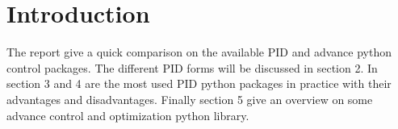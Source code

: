 
\section{Introduction}

The report give a quick comparison on the available  PID and advance python control packages. The different PID forms will be discussed in section 2. In section 3 and 4 are the most used PID python packages in practice with their advantages and disadvantages. Finally section 5 give an overview on some advance control and optimization python library.


\newpage
